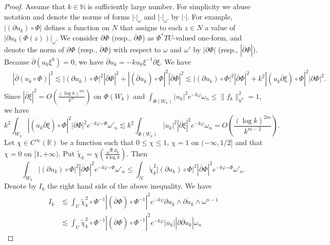 \documentclass[12pt,oneside]{amsart}
\theoremstyle{plain}
\theoremstyle{definition}
\theoremstyle{remark}
\begin{document}
\begin{proof}
Assume that $k \in \mathbb{N}$ is sufficiently large number.  
For simplicity we abuse notation and denote the norms of forms $|\cdot |_{\omega}$ and $|\cdot|_{\omega'}$ by $|\cdot|$.  
For example, $|(\partial u_k) \circ \Phi|$ defines a function on $N$ that assigns to each $z \in N$ a value of $|\partial u_k (\Phi(z))|_{\omega}$.  
%
We consider $\partial \Phi$ (resp., $\overline{\partial}\Phi$) as $\Phi^{*}TU$-valued one-form, and denote 
the norm of $\partial \Phi$ (resp., $\overline{\partial} \Phi$) with respect to $\omega$ and $\omega'$ by $|\partial \Phi|$ (resp., $|\overline{\partial} \Phi|$).  
Because $\overline{\partial}(u_{k}\xi^k) = 0$, we have $\overline{\partial}u_{k} = -ku_{k}\xi^{-1}\overline{\partial} \xi$.  
We have 
\begin{align*}
& |\overline{\partial} (u_{k} \circ \Phi)|^2 
\lesssim | (\partial u_{k}) \circ \Phi|^2 |\overline{\partial}\Phi|^2 + |(\overline{\partial} u_{k}) \circ \Phi|^2  |\overline{\partial} \overline{\Phi}|^2 
\lesssim | (\partial u_{k})\circ \Phi|^2 |\overline{\partial}\Phi|^2 + k^2 |(u_{k}\overline{\partial}\xi)\circ \Phi|^2 |\partial \Phi|^2.  
\end{align*}
Since $|\overline{\partial} \xi|^2= O(\frac{(\log k)^{2m}}{k^{m}})$ on $\Phi(W_{k})$ and $\int_{\Phi(W_k)}|u_k|^2e^{-k\varphi} \omega_n \leq \|f_{k}\|^2_{h^k} = 1$, we have 
\[
k^2 \int_{W_{k}} |(u_{k} \overline{\partial}\xi)\circ \Phi|^2 |\partial \Phi|^2 e^{-k\varphi \circ \Phi} \omega'_{n} 
\lesssim 
k^2 \int_{\Phi(W_{k})} |u_{k}|^2 |\overline{\partial}\xi|^2 e^{-k\varphi} \omega_{n} 
= 
O(\frac{ (\log k)^{2m}}{k^{m-2}}).  
\]
Let $\chi \in C^{\infty}(\mathbb{R})$ be a function such that $0 \leq \chi \leq 1$, $\chi = 1$ on $(-\infty, 1/2]$ and that $\chi = 0$ on $[1, +\infty)$.  
Put $\tilde{\chi}_{k} = \chi (\frac{\sqrt{k}d_{Y}}{4\log k})$.  
Then 
\[
\int_{W_{k}} |(\partial u_{k})\circ \Phi|^2 |\overline{\partial} \Phi|^2 e^{-k\varphi \circ \Phi} \omega'_{n} \leq \int_{N}\tilde{\chi}^2_{k} |(\partial u_{k})\circ \Phi|^2 |\overline{\partial} \Phi|^2 e^{-k\varphi \circ \Phi} \omega'_{n}.  
\]
Denote by $I_{k}$ the right hand side of the above inequality.  
We have 
\begin{align*}
I_{k} & \lesssim \int_{U} \tilde{\chi}^2_{k}\circ \Phi^{-1} |(\overline{\partial} \Phi)\circ \Phi^{-1}|^2 e^{-k \varphi} \partial u_{k} \wedge \overline{\partial u_{k}} \wedge \omega^{n-1} \\
& \lesssim \int_{U} \tilde{\chi}^2_{k}\circ \Phi^{-1} |(\overline{\partial} \Phi)\circ \Phi^{-1}|^2 e^{-k \varphi} |u_{k}| |\partial \overline{\partial} u_{k}| \omega_{n} 

\end{align*}
\end{proof}
\end{document}
